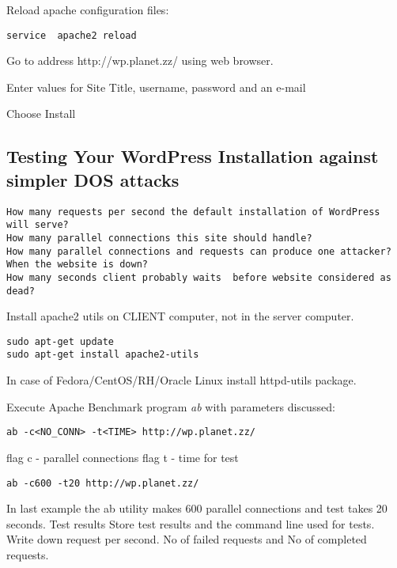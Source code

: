 Reload apache configuration files:
\begin{verbatim}
service  apache2 reload
\end{verbatim}

Go to address http://wp.planet.zz/ using web browser.

Enter values for  Site Title, username, password and an e-mail

Choose Install

\subsection{Testing Your WordPress Installation against simpler DOS attacks}

\begin{Verbatim}[samepage=true,frame=single,
label=Discussion,framesep=2mm,rulecolor=\color{blue},commandchars=\\\{\}]
How many requests per second the default installation of WordPress will serve? 
How many parallel connections this site should handle?
How many parallel connections and requests can produce one attacker?
When the website is down? 
How many seconds client probably waits  before website considered as dead?
\end{Verbatim}

Install apache2 utils on CLIENT computer, not in the server computer.

\begin{verbatim}
sudo apt-get update
sudo apt-get install apache2-utils
\end{verbatim}

In case of Fedora/CentOS/RH/Oracle Linux install httpd-utils package.

Execute Apache Benchmark program \emph{ab} with parameters discussed:
\begin{verbatim}
ab -c<NO_CONN> -t<TIME> http://wp.planet.zz/
\end{verbatim}
flag c - parallel connections
flag t - time for test

\begin{verbatim}
ab -c600 -t20 http://wp.planet.zz/
\end{verbatim}

In last example the ab utility makes 600 parallel connections and test takes 20 seconds.
Test results
Store test results and the command line used for tests.
Write down request per second. No of failed requests and No of completed requests.


